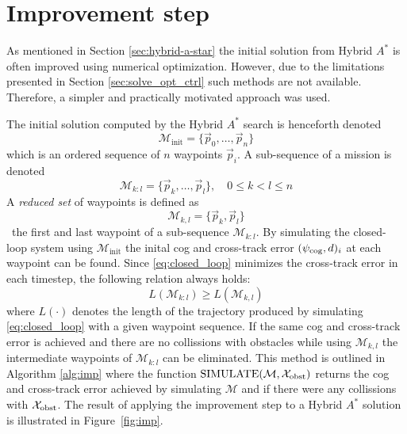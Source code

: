 \section{Improvement step}
As mentioned in Section \ref{sec:hybrid-a-star} the initial solution from Hybrid $A^*$ is often improved using numerical optimization. 
However, due to the limitations presented in Section \ref{sec:solve_opt_ctrl} such methods are not available. Therefore, a simpler and practically motivated approach was used.

The initial solution computed by the Hybrid $A^*$ search is henceforth denoted
\begin{equation}
    \mathcal{M}_{\text{init}}=\{\vec{p}_0,\hdots,\vec{p}_n\}    
\end{equation}
which is an ordered sequence of $n$ waypoints $\vec{p}_i$. A sub-sequence of a mission is denoted
\begin{equation}
    \mathcal{M}_{k:l}=\{\vec{p}_k,\hdots,\vec{p}_l\}, \quad 0\leq k<l\leq n
\end{equation}
A \textit{reduced set} of waypoints is defined as 
\begin{equation}
    \mathcal{M}_{k,l}=\{\vec{p}_k,\vec{p}_l\}
\end{equation}
\ie\ the first and last waypoint of a sub-sequence $\mathcal{M}_{k:l}$. By simulating the closed-loop system using $\mathcal{M}_{\text{init}}$ the inital \ac{cog} and cross-track error $(\psi_{\text{cog}},d)_i$ at each waypoint can be found. 
Since \eqref{eq:closed_loop} minimizes the cross-track error in each timestep, the following relation always holds:
\begin{equation}
    L(\mathcal{M}_{k:l})\geq L(\mathcal{M}_{k,l})
\end{equation}
where $L(\cdot)$ denotes the length of the trajectory produced by simulating \eqref{eq:closed_loop} with a given waypoint sequence. If the same \ac{cog} and cross-track error 
is achieved and there are no collissions with obstacles while using $\mathcal{M}_{k,l}$ the intermediate waypoints of $\mathcal{M}_{k:l}$ can be eliminated. This method is outlined in Algorithm \eqref{alg:imp} where 
the function $\text{SIMULATE}(\mathcal{M},\mathcal{X}_{\text{obst}})$ returns the \ac{cog} and cross-track error achieved by simulating $\mathcal{M}$ and if there were any 
collissions with $\mathcal{X}_{\text{obst}}$. The result of applying the improvement step to a Hybrid $A^*$ solution is illustrated in Figure~\ref{fig:imp}.

